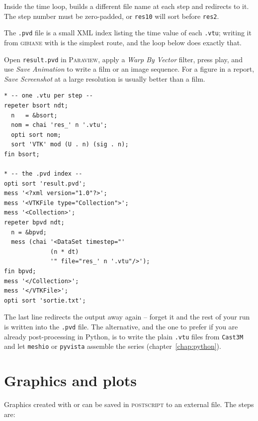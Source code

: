 \begin{castemcom}
Inside the time loop,  builds a different file name at each
step and  redirects to it. The step number must be
zero-padded, or \texttt{res10} will sort before \texttt{res2}.

The \texttt{.pvd} file is a small XML index listing the time value of each
\texttt{.vtu}; writing it from \textsc{gibiane} with  is the
simplest route, and the loop below does exactly that.

\medskip
Open \texttt{result.pvd} in \textsc{Paraview}, apply a
\emph{Warp By Vector} filter, press play, and use \emph{Save Animation} to
write a film or an image sequence. For a figure in a report, \emph{Save
Screenshot} at a large resolution is usually better than a film.
\end{castemcom}
\begin{castemlines}
\begin{verbatim}
* -- one .vtu per step --
repeter bsort ndt;
  n   = &bsort;
  nom = chai 'res_' n '.vtu';
  opti sort nom;
  sort 'VTK' mod (U . n) (sig . n);
fin bsort;

* -- the .pvd index --
opti sort 'result.pvd';
mess '<?xml version="1.0"?>';
mess '<VTKFile type="Collection">';
mess '<Collection>';
repeter bpvd ndt;
  n = &bpvd;
  mess (chai '<DataSet timestep="'
             (n * dt)
             '" file="res_' n '.vtu"/>');
fin bpvd;
mess '</Collection>';
mess '</VTKFile>';
opti sort 'sortie.txt';
\end{verbatim}
\end{castemlines}

\noindent The last line redirects the output away again -- forget it and the
rest of your run is written into the \texttt{.pvd} file. The alternative,
and the one to prefer if you are already post-processing in Python, is to
write the plain \texttt{.vtu} files from \texttt{Cast3M} and let
\texttt{meshio} or \texttt{pyvista} assemble the series
(chapter~\ref{chap:python}).

\section{Graphics and plots}
\label{sec:io:graphics}

Graphics created with  or  can be saved in
\textsc{postscript} to an external file.
 
The steps are:

